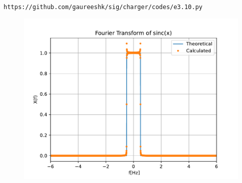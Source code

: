 \documentclass[journal,12pt,twocolumn]{IEEEtran}
\renewcommand\thesection{\arabic{section}}
\begin{document}
\begin{enumerate}[label=\thesection.\arabic*
,ref=\thesection.\theenumi]
\begin{align}
\end{align}
\begin{lstlisting}
https://github.com/gaureeshk/sig/charger/codes/e3.10.py
\end{lstlisting}
\begin{figure}[!ht]
	\begin{center}
		\includegraphics[width=\columnwidth]{./figs/e3.10.pdf}
	\end{center}
	\label{fig:}	
\end{figure}
\end{enumerate}
\end{document}
